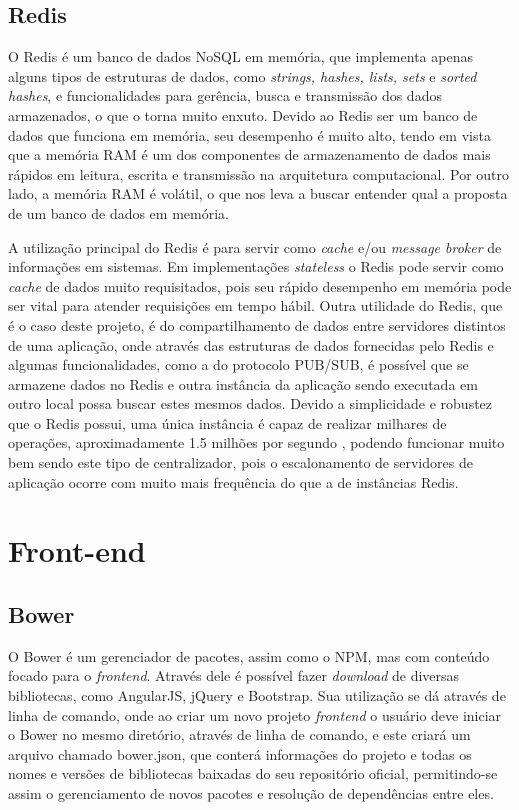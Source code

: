 \subsection{Redis}
O Redis é um banco de dados NoSQL em memória, que implementa apenas alguns tipos de estruturas de dados, como \textit{strings, hashes, lists, sets} e \textit{sorted hashes}, e funcionalidades para gerência, busca e transmissão dos dados armazenados, o que o torna muito enxuto. Devido ao Redis ser um banco de dados que funciona em memória, seu desempenho é muito alto, tendo em vista que a memória RAM é um dos componentes de armazenamento de dados mais rápidos em leitura, escrita e transmissão na arquitetura computacional. Por outro lado, a memória RAM é volátil, o que nos leva a buscar entender qual a proposta de um banco de dados em memória.

A utilização principal do Redis é para servir como \textit{cache} e/ou \textit{message broker} de informações em sistemas. Em implementações \textit{stateless} o Redis pode servir como \textit{cache} de dados muito requisitados, pois seu rápido desempenho em memória pode ser vital para atender requisições em tempo hábil. Outra utilidade do Redis, que é o caso deste projeto, é do compartilhamento de dados entre servidores distintos de uma aplicação, onde através das estruturas de dados fornecidas pelo Redis e algumas funcionalidades, como a do protocolo PUB/SUB, é possível que se armazene dados no Redis e outra instância da aplicação sendo executada em outro local possa buscar estes mesmos dados. Devido a simplicidade e robustez que o Redis possui, uma única instância é capaz de realizar milhares de operações, aproximadamente 1.5 milhões por segundo \cite{redis-metrics}, podendo funcionar muito bem sendo este tipo de centralizador, pois o escalonamento de servidores de aplicação ocorre com muito mais frequência do que a de instâncias Redis. 

\section{Front-end}

\subsection{Bower}
O Bower \cite{bower} é um gerenciador de pacotes, assim como o NPM, mas com conteúdo focado para o \textit{frontend}. Através dele é possível fazer \textit{download} de diversas bibliotecas, como AngularJS, jQuery e Bootstrap. Sua utilização se dá através de linha de comando, onde ao criar um novo projeto \textit{frontend} o usuário deve iniciar o Bower no mesmo diretório, através de linha de comando, e este criará um arquivo chamado bower.json, que conterá informações do projeto e todas os nomes e versões de bibliotecas baixadas do seu repositório oficial, permitindo-se assim o gerenciamento de novos pacotes e resolução de dependências entre eles.

